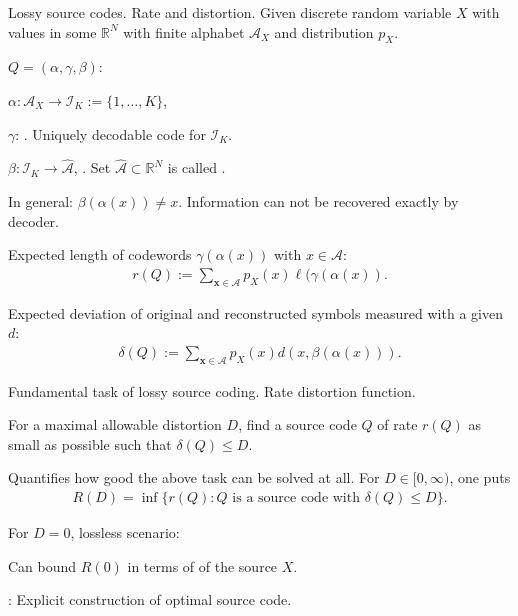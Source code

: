 \begin{frame}{Lossy source codes. Rate and distortion.}
Given discrete random variable $X$ with values in some $\mathbb{R}^N$ with finite alphabet $\mathcal{A}_X$ and distribution $p_{X}$. 

 $Q=(\alpha,\gamma,\beta)$:
\bit
\item $\alpha: \mathcal{A}_X\to \mathcal{I}_K:=\{1,\dots,K\}$, 
\item $\gamma$: . Uniquely decodable code for $\mathcal{I}_K$. 
\item $\beta: \mathcal{I}_K\to\widehat{\mathcal{A}}$, . Set $\widehat{\mathcal{A}}\subset\mathbb{R}^N$ is called . 
\item In general: $\beta(\alpha(x))\neq x$. Information can not be recovered exactly by decoder.
\eit
{}
\bit
\item {} Expected length of codewords $\gamma(\alpha(x))$ with $x\in\mathcal{A}$:  
\begin{align*}
r(Q):=\sum_{\mathbf{x}\in\mathcal{A}}p_X(x)\ell(\gamma(\alpha(x)).
\end{align*}
\item {} Expected 
 deviation of original and reconstructed symbols measured with a given  $d$:
\begin{align*}
\delta(Q):=\sum_{\mathbf{x}\in\mathcal{A}}p_X(x)d(x,\beta(\alpha(x))).
\end{align*}
\eit
\end{frame}



\begin{frame}{Fundamental task of lossy source coding. Rate distortion function.}
\bit
\item []For a maximal allowable distortion $D$, find a source code $Q$ of rate $r(Q)$ as small 
as possible such that $\delta(Q)\leq D$. 
\eit 

\bit
\item Quantifies how good the above task can be solved at all. For $D\in [0,\infty)$, one puts
\begin{align*}
R(D)= \inf\{r(Q)\colon \text{$Q$ is a source code with $\delta(Q)\leq D$}\}.
\end{align*}
\item For $D=0$, lossless scenario: 
\bit
\item Can bound $R(0)$ in terms of  of the source $X$. 
\item {}: Explicit construction of optimal source code.  
\eit 
\eit 
{} 
\end{frame}


